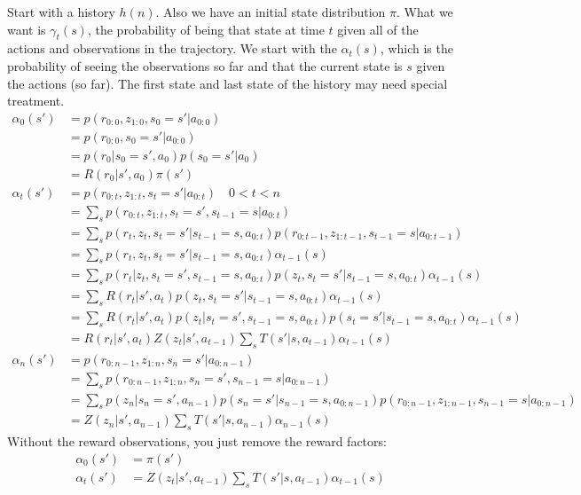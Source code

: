\documentclass[10pt,english]{article}
\begin{document}
Start with a history $h(n)$. Also we have an initial state distribution $\pi$. What we want is $\gamma_t(s)$, the probability of being that state at time $t$ given all of the actions and observations in the trajectory. We start with the $\alpha_t(s)$, which is the probability of seeing the observations so far and that the current state is $s$ given the actions (so far). The first state and last state of the history may need special treatment.
\begin{align}
\alpha_{0}(s') &= p(r_{0:0}, z_{1:0}, s_{0} = s' | a_{0:0}) \\
&= p(r_{0:0}, s_{0} = s' | a_{0:0}) \\
&= p(r_{0} | s_{0} = s', a_{0}) p(s_{0} = s' | a_{0}) \\
&= R(r_{0} | s',a_{0}) \pi(s') \\
\alpha_{t}(s') &= p(r_{0:t}, z_{1:t}, s_{t} = s' | a_{0:t}) \quad 0 < t < n\\
&= \sum_s p(r_{0:t}, z_{1:t}, s_{t} = s', s_{t-1} = s | a_{0:t}) \\
&= \sum_s p(r_{t}, z_{t}, s_{t} = s' |s_{t-1} = s, a_{0:t}) p(r_{0:t-1}, z_{1:t-1}, s_{t-1} = s | a_{0:t-1}) \\
&= \sum_s p(r_{t}, z_{t}, s_{t} = s' |s_{t-1} = s, a_{0:t}) \alpha_{t-1}(s) \\
&= \sum_s p(r_{t} |z_{t}, s_{t} = s', s_{t-1} = s, a_{0:t})p(z_{t}, s_{t} = s' |s_{t-1} = s, a_{0:t}) \alpha_{t-1}(s) \\
&= \sum_s R(r_{t} |s', a_{t})p(z_{t}, s_{t} = s' |s_{t-1} = s, a_{0:t}) \alpha_{t-1}(s) \\
&= \sum_s R(r_{t} |s', a_{t})p(z_{t} |s_{t} = s', s_{t-1} = s, a_{0:t})p(s_{t} = s' |s_{t-1} = s, a_{0:t}) \alpha_{t-1}(s) \\
&= R(r_{t} |s', a_{t})Z(z_{t} |s', a_{t-1}) \sum_s T(s' |s, a_{t-1}) \alpha_{t-1}(s) \\
\alpha_{n}(s') &= p(r_{0:n-1}, z_{1:n}, s_{n} = s' | a_{0:n-1}) \\
&= \sum_s p(r_{0:n-1}, z_{1:n}, s_{n} = s', s_{n-1} = s | a_{0:n-1}) \\
&= \sum_s p(z_{n} | s_{n} = s', a_{n-1}) p(s_{n} = s' |s_{n-1} = s, a_{0:n-1}) p(r_{0:n-1}, z_{1:n-1}, s_{n-1} = s | a_{0:n-1}) \\
&= Z(z_n | s', a_{n-1}) \sum_s T(s' |s, a_{n-1}) \alpha_{n-1}(s)
\end{align}
Without the reward observations, you just remove the reward factors:
\begin{align}
\alpha_{0}(s') &= \pi(s') \\
\alpha_{t}(s') &= Z(z_{t} |s', a_{t-1}) \sum_s T(s' |s, a_{t-1}) \alpha_{t-1}(s)
\end{align}
\end{document}
